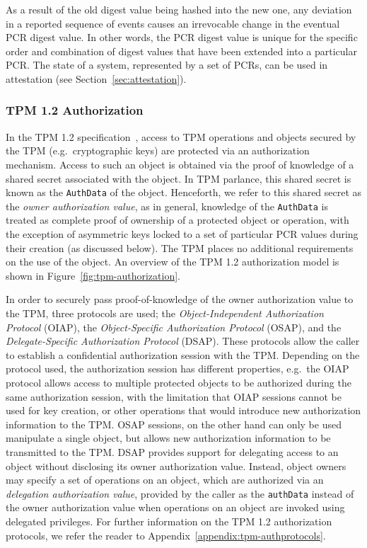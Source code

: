 \documentclass{sig-alternate-2013}
\def\istechreport{1}
\begin{document}
As a result of the old digest value being hashed into the new one, any deviation
in a reported sequence of events causes an irrevocable change in the eventual
PCR digest value. In other words, the PCR digest value is unique for the
specific order and combination of digest values that have been extended into a
particular PCR\@. The state of a system, represented by a set of PCRs, can be
used in attestation (see Section~\ref{sec:attestation}).

\vspace{-.5\baselineskip}

\subsubsection{TPM 1.2 Authorization}

In the TPM 1.2 specification~\cite{TPM1.2}, access to TPM operations and objects
secured by the TPM (e.g.\ cryptographic keys) are protected via an authorization
mechanism. Access to such an object is obtained via the proof of knowledge of a
shared secret associated with the object. In TPM parlance, this shared secret is
known as the \texttt{AuthData} of the object. Henceforth, we refer to this
shared secret as the \emph{owner authorization value}, as in general, knowledge
of the \texttt{AuthData} is treated as complete proof of ownership of a
protected object or operation, with the exception of asymmetric keys locked to a
set of particular PCR values during their creation (as discussed below). The TPM
places no additional requirements on the use of the object. An overview of the
TPM 1.2 authorization model is shown in Figure~\ref{fig:tpm-authorization}.

In order to securely pass proof-of-knowledge of the owner authorization value to
the TPM, three protocols are used; the \emph{Object-Independent Authorization
Protocol} (OIAP), the \emph{Object-Specific Authorization Protocol} (OSAP), and
the \emph{Delegate-Specific Authorization Protocol} (DSAP). These protocols
allow the caller to establish a confidential authorization session with the
TPM\@. Depending on the protocol used, the authorization session has different
properties, e.g.\ the OIAP protocol allows access to multiple protected objects
to be authorized during the same authorization session, with the limitation that
OIAP sessions cannot be used for key creation, or other operations that would
introduce new authorization information to the TPM\@. OSAP sessions, on the
other hand can only be used manipulate a single object, but allows new
authorization information to be transmitted to the TPM\@. DSAP provides support
for delegating access to an object without disclosing its owner authorization
value. Instead, object owners may specify a set of operations on an object,
which are authorized via an \emph{delegation authorization value}, provided by
the caller as the \texttt{authData} instead of the owner authorization value
when operations on an object are invoked using delegated privileges.
\ifdefined\istechreport For further information on the TPM 1.2 authorization
protocols, we refer the reader to Appendix~\ref{appendix:tpm-authprotocols}. \fi
\end{document}
